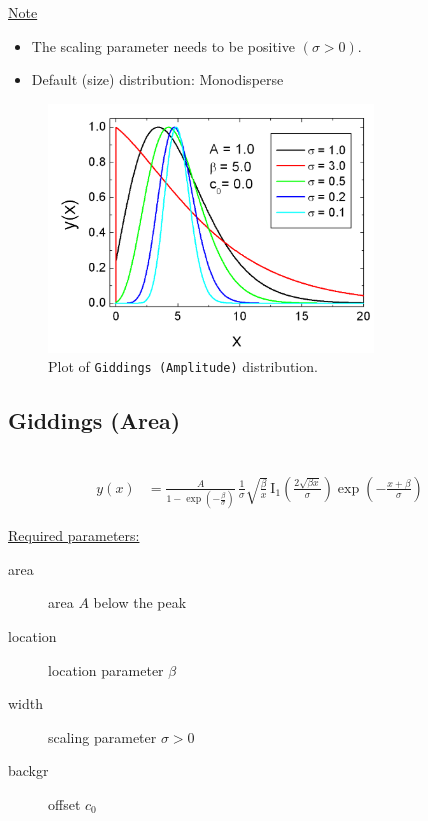 \underline{Note}
\begin{itemize}
  \item The scaling parameter needs to be positive $(\sigma > 0)$.
  \item Default (size) distribution: Monodisperse
\end{itemize}

\begin{figure}[htb]
\begin{center}
\includegraphics[width=0.768\textwidth]{GiddingsAmplitude.png}
\end{center}
\caption{Plot of \texttt{Giddings (Amplitude)} distribution.}
\label{fig:GiddingsAmplitude}
\end{figure}


\clearpage
\subsection{Giddings (Area)} ~\\
\label{sec:GiddingsArea}
\begin{align}
y(x) & =  \frac{A}{1-\exp\left(-\frac{\beta}{\sigma}\right)} \,
\frac{1}{\sigma} \sqrt{\frac{\beta}{x}} \,
\mathrm{I}_1\left(\frac{2\sqrt{\beta x}}{\sigma}\right)
\exp\left(-\frac{x+\beta}{\sigma}\right)
\end{align}

\underline{Required parameters:}
\begin{description}
    \item[area] area $A$ below the peak
    \item[location] location parameter $\beta$
    \item[width] scaling parameter $\sigma > 0$
    \item[backgr] offset $c_0$
\end{description}

